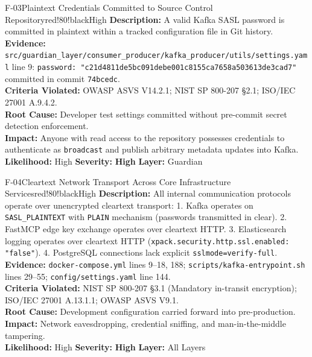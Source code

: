 \documentclass[10pt,a4paper]{report}
\begin{document}
\begin{findingbox}{F-03}{Plaintext Credentials Committed to Source Control Repository}{red!80!black}{High}
\textbf{Description:} A valid Kafka SASL password is committed in plaintext within a tracked configuration file in Git history.\\
\textbf{Evidence:} \texttt{src/guardian\_layer/consumer\_producer/kafka\_producer/utils/settings.yaml} line 9: \texttt{password: "c21d4811de5bc091debe001c8155ca7658a503613de3cad7"} committed in commit \texttt{74bcedc}.\\
\textbf{Criteria Violated:} OWASP ASVS V14.2.1; NIST SP 800-207 §2.1; ISO/IEC 27001 A.9.4.2.\\
\textbf{Root Cause:} Developer test settings committed without pre-commit secret detection enforcement.\\
\textbf{Impact:} Anyone with read access to the repository possesses credentials to authenticate as \texttt{broadcast} and publish arbitrary metadata updates into Kafka.\\
\textbf{Likelihood:} High \quad \textbar \quad \textbf{Severity:} \textbf{High} \quad \textbar \quad \textbf{Layer:} Guardian
\end{findingbox}

\begin{findingbox}{F-04}{Cleartext Network Transport Across Core Infrastructure Services}{red!80!black}{High}
\textbf{Description:} All internal communication protocols operate over unencrypted cleartext transport:
1. Kafka operates on \texttt{SASL\_PLAINTEXT} with \texttt{PLAIN} mechanism (passwords transmitted in clear).
2. FastMCP edge key exchange operates over cleartext HTTP.
3. Elasticsearch logging operates over cleartext HTTP (\texttt{xpack.security.http.ssl.enabled: "false"}).
4. PostgreSQL connections lack explicit \texttt{sslmode=verify-full}.\\
\textbf{Evidence:} \texttt{docker-compose.yml} lines 9--18, 188; \texttt{scripts/kafka-entrypoint.sh} lines 29--55; \texttt{config/settings.yaml} line 144.\\
\textbf{Criteria Violated:} NIST SP 800-207 §3.1 (Mandatory in-transit encryption); ISO/IEC 27001 A.13.1.1; OWASP ASVS V9.1.\\
\textbf{Root Cause:} Development configuration carried forward into pre-production.\\
\textbf{Impact:} Network eavesdropping, credential sniffing, and man-in-the-middle tampering.\\
\textbf{Likelihood:} High \quad \textbar \quad \textbf{Severity:} \textbf{High} \quad \textbar \quad \textbf{Layer:} All Layers
\end{findingbox}
\end{document}
